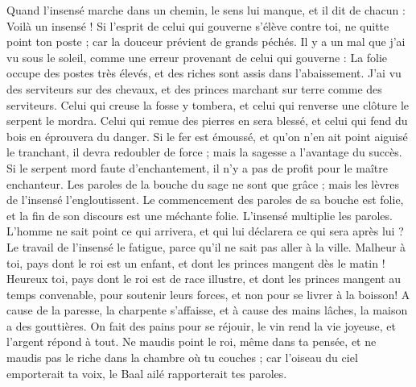 \begin{multicols}{2}
Quand l'insensé marche dans un chemin, le sens lui manque, et il dit de chacun : Voilà un insensé !
Si l'esprit de celui qui gouverne s'élève contre toi, ne quitte point ton poste ; car la douceur prévient de grands péchés.
Il y a un mal que j'ai vu sous le soleil, comme une erreur provenant de celui qui gouverne :
La folie occupe des postes très élevés, et des riches sont assis dans l'abaissement.
J'ai vu des serviteurs sur des chevaux, et des princes marchant sur terre comme des serviteurs.
Celui qui creuse la fosse y tombera, et celui qui renverse une clôture le serpent le mordra.
Celui qui remue des pierres en sera blessé, et celui qui fend du bois en éprouvera du danger.
Si le fer est émoussé, et qu'on n'en ait point aiguisé le tranchant, il devra redoubler de force ; mais la sagesse a l'avantage du succès.
Si le serpent mord faute d'enchantement, il n'y a pas de profit pour le maître enchanteur.
Les paroles de la bouche du sage ne sont que grâce ; mais les lèvres de l'insensé l'engloutissent.
Le commencement des paroles de sa bouche est folie, et la fin de son discours est une méchante folie.
L'insensé multiplie les paroles. L'homme ne sait point ce qui arrivera, et qui lui déclarera ce qui sera après lui ?
Le travail de l'insensé le fatigue, parce qu'il ne sait pas aller à la ville.
Malheur à toi, pays dont le roi est un enfant, et dont les princes mangent dès le matin !
Heureux toi, pays dont le roi est de race illustre, et dont les princes mangent au temps convenable, pour soutenir leurs forces, et non pour se livrer à la boisson!
A cause de la paresse, la charpente s'affaisse, et à cause des mains lâches, la maison a des gouttières.
On fait des pains pour se réjouir, le vin rend la vie joyeuse, et l'argent répond à tout.
Ne maudis point le roi, même dans ta pensée, et ne maudis pas le riche dans la chambre où tu couches ; car l'oiseau du ciel emporterait ta voix, le Baal ailé rapporterait tes paroles.

\end{multicols}
